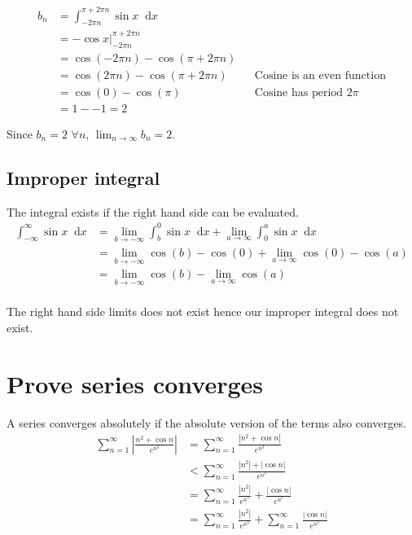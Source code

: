 \documentclass{article}
\newcommand{\diff}{\mathop{}\!\mathrm{d}}
\begin{document}
\begin{align*}
    b_n &= \int_{-2\pi n}^{\pi + 2\pi n} \sin x \diff x \\
    &= -\cos x \Big|_{-2\pi n}^{\pi + 2\pi n} \\
    &= \cos (-2\pi n) - \cos (\pi + 2\pi n) \\
    &= \cos (2\pi n) - \cos (\pi + 2\pi n)
    && \text{Cosine is an even function} \\
    &= \cos (0) - \cos (\pi)
    && \text{Cosine has period $2\pi$} \\
    &= 1 - -1 = 2
\end{align*}

Since $b_n = 2$ $\forall n$, $\lim_{n \to \infty} b_n = 2$.

\subsection{Improper integral}
The integral exists if the right hand side can be evaluated.
\begin{align*}
    \int_{-\infty}^{\infty} \sin x \diff x
    &= \lim_{b \to -\infty} \int_{b}^{0} \sin x \diff x
    + \lim_{a \to \infty} \int_{0}^{a} \sin x \diff x \\
    &= \lim_{b \to -\infty} \cos (b) - \cos (0)
    + \lim_{a \to \infty} \cos (0) - \cos (a) \\
    &= \lim_{b \to -\infty} \cos (b) - \lim_{a \to \infty} \cos (a) \\
\end{align*}

The right hand side limits does not exist hence our improper integral
does not exist.

\section{Prove series converges}
A series converges absolutely if the absolute version of the terms also
converges.
\begin{align*}
    \sum_{n=1}^\infty \left| \frac{n^2 + \cos n}{e^{n^3}} \right|
    &= \sum_{n=1}^\infty \frac{\left| n^2 + \cos n \right|}{e^{n^3}} \\
    &< \sum_{n=1}^\infty \frac{\left| n^2 \right| + \left| \cos n \right|}
    {e^{n^3}} \\
    &= \sum_{n=1}^\infty \frac{\left| n^2 \right|}{e^{n^3}}
    + \frac{\left| \cos n \right|}{e^{n^3}} \\
    &= \sum_{n=1}^\infty \frac{\left| n^2 \right|}{e^{n^3}}
    + \sum_{n=1}^\infty \frac{\left| \cos n \right|}{e^{n^3}} \\
\end{align*}
\end{document}
